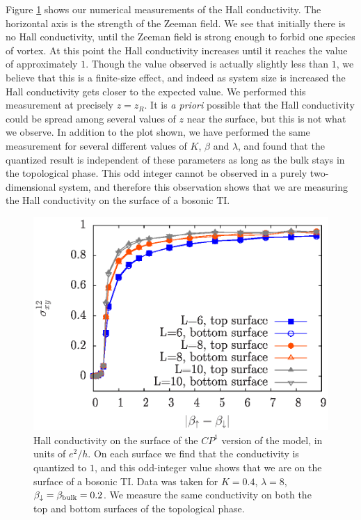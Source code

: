 \documentclass[prb,twocolumn]{revtex4-1}
\begin{document}
Figure \ref{cp1hall} shows our numerical measurements of the Hall conductivity. The horizontal axis is the strength of the Zeeman field. We see that initially there is no Hall conductivity, until the Zeeman field is strong enough to forbid one species of vortex. At this point the Hall conductivity increases until it reaches the value of approximately $1$. Though the value observed is actually slightly less than $1$, we believe that this is a finite-size effect, and indeed as system size is increased the Hall conductivity gets closer to the expected value. We performed this measurement at precisely $z=z_R$. It is {\em a priori} possible that the Hall conductivity could be spread among several values of $z$ near the surface, but this is not what we observe. In addition to the plot shown, we have performed the same measurement for several different values of $K$, $\beta$ and $\lambda$, and found that the quantized result is independent of these parameters as long as the bulk stays in the topological phase. This odd integer cannot be observed in a purely two-dimensional system, and therefore this observation shows that we are measuring the Hall conductivity on the surface of a bosonic TI.

\begin{figure}
\includegraphics[width=0.9\linewidth]{figures/cp1hall.eps}
\caption{Hall conductivity on the surface of the $CP^1$ version of the model, in units of $e^2/h$. On each surface we find that the conductivity is quantized to $1$, and this odd-integer value shows that we are on the surface of a bosonic TI. Data was taken for $K=0.4$, $\lambda=8$, $\beta_\downarrow=\beta_{\rm bulk}=0.2$. We measure the same conductivity on both the top and bottom surfaces of the topological phase.}
\label{cp1hall}
\end{figure}
\end{document}
